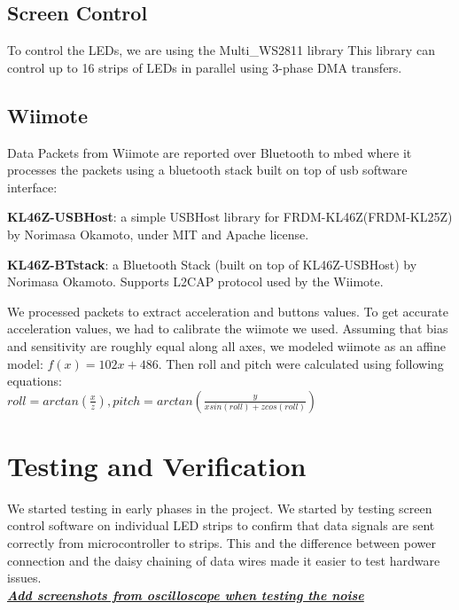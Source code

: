 \documentclass{tufte-handout}
\begin{document}
\subsection{Screen Control}
To control the LEDs, we are using the Multi\_WS2811 library This library can control up to 16 strips of LEDs in
parallel using 3-phase DMA transfers. 
\subsection{Wiimote}
Data Packets from Wiimote are reported over Bluetooth to mbed where it processes the packets using a bluetooth stack built on top of usb software interface:
\begin{enumerate*}
    \item
        \textbf{KL46Z-USBHost}:
a simple USBHost library for FRDM-KL46Z(FRDM-KL25Z) by Norimasa Okamoto, under MIT and Apache license.
\item
    \textbf{KL46Z-BTstack}:
a Bluetooth Stack (built on top of KL46Z-USBHost) by Norimasa Okamoto. Supports L2CAP protocol used by the Wiimote.
\end{enumerate*}
We processed packets to extract acceleration and buttons values. To get accurate acceleration values, we had to calibrate the wiimote we used. Assuming that bias and sensitivity are roughly equal along all axes, we modeled wiimote as an affine model: $f(x) = 102x + 486 $. Then roll and pitch were calculated using following equations:\\
$ roll = arctan(\frac{x}{z}) , pitch = arctan(\frac{y}{x sin(roll) + z cos(roll)})$
\section{\textbf{Testing and Verification}} 
We started testing in early phases in the project. We started by testing screen control software on individual LED strips to confirm that data signals are sent correctly from microcontroller to strips. This and the difference between power connection and the daisy chaining of data wires made it easier to test hardware issues.\\
\underline{\textbf{\textit{Add screenshots from oscilloscope when testing the noise }}}
\end{document}
